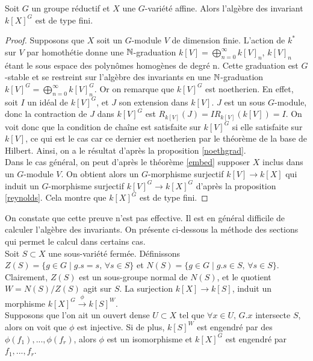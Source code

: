 \begin{thm}[Hilbert]\label{hilbert}
Soit $G$ un groupe réductif et $X$ une $G$-variété affine. Alors l'algèbre des invariant $k[X]^G$ est de type fini.
\end{thm}
\begin{proof}
Supposons que $X$ soit un $G$-module $V$ de dimension finie. L'action de $k^*$ sur $V$ par homothétie donne une $\mathbb{N}$-graduation $k[V]=\bigoplus_{n=0}^{\infty}k[V]_n$, $k[V]_n$ étant le sous espace des polynômes homogènes de degré n. Cette graduation est $G$-stable et se restreint sur l'algèbre des invariants en une $\mathbb{N}$-graduation $k[V]^G=\bigoplus_{n=0}^{\infty}k[V]^G_n$. Or on remarque que $k[V]^G$ est noetherien. En effet, soit $I$ un idéal de $k[V]^G$, et $J$ son extension dans $k[V]$. $J$ est un sous $G$-module, donc la contraction de $J$ dans $k[V]^G$ est $R_{k[V]}(J)=IR_{k[V]}(k[V])=I$. On voit donc que la condition de chaîne est satisfaite sur $k[V]^G$ si elle satisfaite sur $k[V]$, ce qui est le cas car ce dernier est noetherien par le théorème de la base de Hilbert. Ainsi, on a le résultat d'après la proposition \ref{noethgrad}.\\
Dans le cas général, on peut d'après le théorème \ref{embed} supposer $X$ inclus dans un $G$-module $V$. On obtient alors un $G$-morphisme surjectif $k[V] \rightarrow k[X]$ qui induit un $G$-morphisme surjectif $k[V]^G \rightarrow k[X]^G$ d'après la proposition \ref{reynolds}. Cela montre que $k[X]^G$ est de type fini.
\end{proof}

On constate que cette preuve n'est pas effective. Il est en général difficile de calculer l'algèbre des invariants. On présente ci-dessous la méthode des sections qui permet le calcul dans certains cas.\\
Soit $S\subset X$ une sous-variété fermée. Définissons $Z(S)=\lbrace g\in G\mid g.s=s,\,\forall s \in S\rbrace$ et $N(S)=\lbrace g\in G\mid g.s\in S,\,\forall s \in S\rbrace$. Clairement, $Z(S)$ est un sous-groupe normal de $N(S)$, et le quotient $W=N(S)/Z(S)$ agit sur $S$. La surjection $k[X]\rightarrow k[S]$, induit un morphisme $k[X]^G\xrightarrow{\phi} k[S]^W$.\\
Supposons que l'on ait un ouvert dense $U\subset X$ tel que $\forall x\in U,\, G.x$ intersecte $S$, alors on voit que $\phi$ est injective. Si de plus, $k[S]^W$ est engendré par des $\phi(f_1),...,\phi(f_r)$, alors $\phi$ est un isomorphisme et $k[X]^G$ est engendré par $f_1,...,f_r$.

